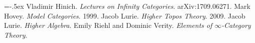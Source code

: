 \begin{thebibliography}{MMMM}
    \itemsep=-.5ex
     Vladimir Hinich. \emph{Lectures on Infinity Categories}. arXiv:1709.06271.
     Mark Hovey. \emph{Model Categories}. 1999.
     Jacob Lurie. \emph{Higher Topos Theory}. 2009.
     Jacob Lurie. \emph{Higher Algebra}.
     Emily Riehl and Dominic Verity. \emph{Elements of $\infty$-Category Theory}.
\end{thebibliography}
